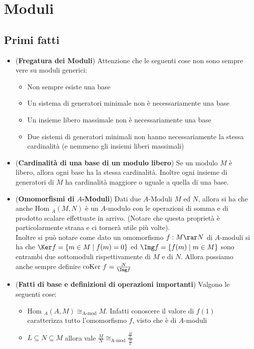 \documentclass[a4paper,NoNotes,GeneralMath]{stdmdoc}
\newcommand{\Hom}{\text{Hom }}
\newcommand{\coKer}{\text{coKer }}
\begin{document}
	\section*{Moduli}
	\subsection*{Primi fatti}
	\begin{itemize}
		\item ({\bf Fregatura dei Moduli}) Attenzione che le seguenti cose non sono sempre vere su moduli generici:
			\begin{itemize}
				\item Non sempre esiste una base
				\item Un sistema di generatori minimale non è necessariamente una base
				\item Un insieme libero massimale non è necessariamente una base
				\item Due sistemi di generatori minimali non hanno necessariamente la stessa cardinalità (e nemmeno gli insiemi liberi massimali)
			\end{itemize}
		\item ({\bf Cardinalità di una base di un modulo libero}) Se un modulo $M$ è libero, allora ogni base ha la stessa cardinalità. Inoltre ogni insieme di generatori di $M$ ha cardinalità maggiore o uguale a quella di una base.
		\item ({\bf Omomorfismi di $A$-Moduli}) Dati due $A$-Moduli $M$ ed $N$, allora si ha che anche $\Hom_A(M, N)$ è un $A$-modulo con le operazioni di somma e di prodotto scalare effettuate in arrivo. (Notare che questa proprietà è particolarmente strana e ci tornerà utile più volte). \\
		Inoltre si può notare come dato un omomorfismo $f: M \rar N$ di $A$-moduli si ha che $\Ker f = \{ m \in M \mid f(m) = 0 \}$ ed $\Img f = \{ f(m) \mid m \in M \}$ sono entrambi due sottomoduli rispettivamente di $M$ e di $N$. Allora possiamo anche sempre definire $\coKer f = \frac{N}{\Img f}$
		\item ({\bf Fatti di base e definizioni di operazioni importanti}) Valgono le seguenti cose:
			\begin{itemize}
				\item $\Hom_A(A, M) \cong_{\text{A-mod}} M$. Infatti conoscere il valore di $f(1)$ caratterizza tutto l'omomorfismo $f$, visto che è di $A$-moduli
				\item $L \subseteq N \subseteq M$ allora vale $\frac{M}{N} \cong_{\text{A-mod}} \frac{\frac{M}{L}}{\frac{N}{L}}$

\end{itemize}
\end{itemize}
\end{document}
